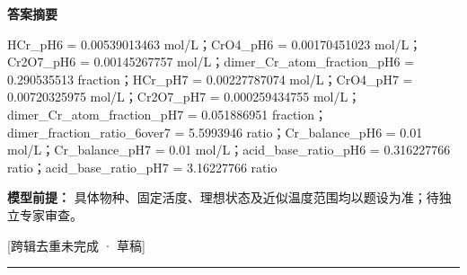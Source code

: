 \documentclass[UTF8,11pt,a4paper]{ctexart}
\begin{document}
\noindent\textbf{答案摘要}\par
HCr\_pH6 = 0.00539013463 mol/L；CrO4\_pH6 = 0.00170451023 mol/L；Cr2O7\_pH6 = 0.00145267757 mol/L；dimer\_Cr\_atom\_fraction\_pH6 = 0.290535513 fraction；HCr\_pH7 = 0.00227787074 mol/L；CrO4\_pH7 = 0.00720325975 mol/L；Cr2O7\_pH7 = 0.000259434755 mol/L；dimer\_Cr\_atom\_fraction\_pH7 = 0.051886951 fraction；dimer\_fraction\_ratio\_6over7 = 5.5993946 ratio；Cr\_balance\_pH6 = 0.01 mol/L；Cr\_balance\_pH7 = 0.01 mol/L；acid\_base\_ratio\_pH6 = 0.316227766 ratio；acid\_base\_ratio\_pH7 = 3.16227766 ratio\par
\noindent\textbf{模型前提：}
具体物种、固定活度、理想状态及近似温度范围均以题设为准；待独立专家审查。\par
\noindent\textcolor{red!65!black}{[跨辑去重未完成 · 草稿]} \par
\medskip\hrule\medskip
{}
\end{document}
